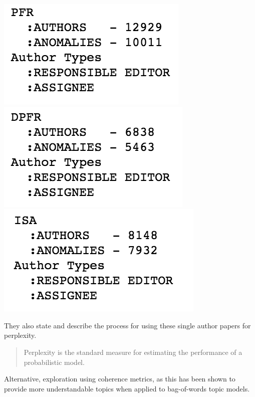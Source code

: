 \documentclass{article}
\begin{document}
\begin{multicols}{2}
\includegraphics[width=.27\columnwidth]{../images/PFR_count.png}
\includegraphics[width=.27\columnwidth]{../images/DPFR_count.png}
\includegraphics[width=.27\columnwidth]{../images/ISA_count.png}

They\cite{RosenZvi2004}
also state and describe the process for using these single author papers for perplexity.
\begin{quote}
  Perplexity is the standard measure for estimating the performance of a probabilistic model.
\end{quote}
Alternative, exploration using coherence metrics\cite{Roder2015}, as this has been shown to
provide more understandable topics when applied to bag-of-words topic models.


\end{multicols}
\end{document}
